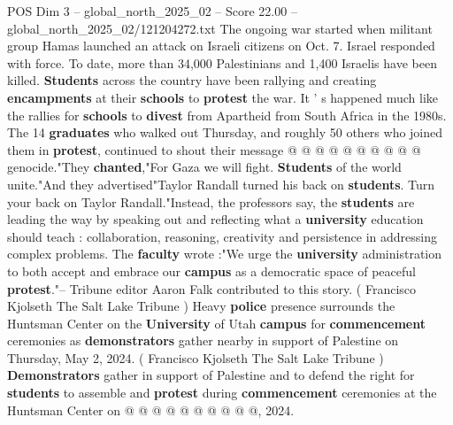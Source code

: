 \begin{textsample}{POS Dim 3 – global\_north\_2025\_02 – Score 22.00 – global\_north\_2025\_02/121204272.txt}
The ongoing war started when militant group Hamas launched an attack on Israeli citizens on Oct. 7.
Israel responded with force.
To date, more than 34,000 Palestinians and 1,400 Israelis have been killed. \textbf{Students} across the country have been rallying and creating \textbf{encampments} at their \textbf{schools} to \textbf{protest} the war.
It ' s happened much like the rallies for \textbf{schools} to \textbf{divest} from Apartheid from South Africa in the 1980s.
The 14 \textbf{graduates} who walked out Thursday, and roughly 50 others who joined them in \textbf{protest}, continued to shout their message @ @ @ @ @ @ @ @ @ @ genocide."They \textbf{chanted},"For Gaza we will fight. \textbf{Students} of the world unite."And they advertised"Taylor Randall turned his back on \textbf{students}.
Turn your back on Taylor Randall."Instead, the professors say, the \textbf{students} are leading the way by speaking out and reflecting what a \textbf{university} education should teach : collaboration, reasoning, creativity and persistence in addressing complex problems.
The \textbf{faculty} wrote :"We urge the \textbf{university} administration to both accept and embrace our \textbf{campus} as a democratic space of peaceful \textbf{protest}."-- Tribune editor Aaron Falk contributed to this story. ( Francisco Kjolseth The Salt Lake Tribune ) Heavy \textbf{police} presence surrounds the Huntsman Center on the \textbf{University} of Utah \textbf{campus} for \textbf{commencement} ceremonies as \textbf{demonstrators} gather nearby in support of Palestine on Thursday, May 2, 2024. ( Francisco Kjolseth The Salt Lake Tribune ) \textbf{Demonstrators} gather in support of Palestine and to defend the right for \textbf{students} to assemble and \textbf{protest} during \textbf{commencement} ceremonies at the Huntsman Center on @ @ @ @ @ @ @ @ @ @, 2024.

\end{textsample}
